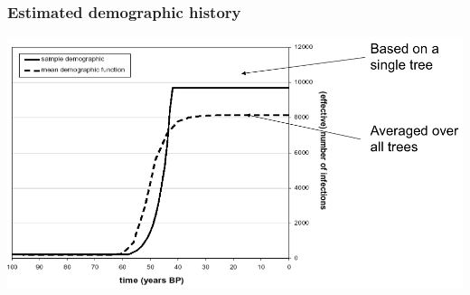 \begin{frame}
\frametitle{Estimated demographic history}

\includegraphics[width=\textwidth]{../../images/DemographicHistory}

\end{frame}
